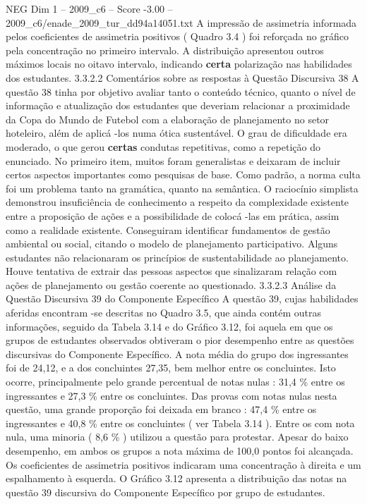 \begin{textsample}{NEG Dim 1 – 2009\_c6 – Score -3.00 – 2009\_c6/enade\_2009\_tur\_dd94a14051.txt}
A impressão de assimetria informada pelos coeficientes de assimetria positivos ( Quadro 3.4 ) foi reforçada no gráfico pela concentração no primeiro intervalo.
A distribuição apresentou outros máximos locais no oitavo intervalo, indicando \textbf{certa} polarização nas habilidades dos estudantes. 3.3.2.2 Comentários sobre as respostas à Questão Discursiva 38 A questão 38 tinha por objetivo avaliar tanto o conteúdo técnico, quanto o nível de informação e atualização dos estudantes que deveriam relacionar a proximidade da Copa do Mundo de Futebol com a elaboração de planejamento no setor hoteleiro, além de aplicá -los numa ótica sustentável.
O grau de dificuldade era moderado, o que gerou \textbf{certas} condutas repetitivas, como a repetição do enunciado.
No primeiro item, muitos foram generalistas e deixaram de incluir certos aspectos importantes como pesquisas de base.
Como padrão, a norma culta foi um problema tanto na gramática, quanto na semântica.
O raciocínio simplista demonstrou insuficiência de conhecimento a respeito da complexidade existente entre a proposição de ações e a possibilidade de colocá -las em prática, assim como a realidade existente.
Conseguiram identificar fundamentos de gestão ambiental ou social, citando o modelo de planejamento participativo.
Alguns estudantes não relacionaram os princípios de sustentabilidade ao planejamento.
Houve tentativa de extrair das pessoas aspectos que sinalizaram relação com ações de planejamento ou gestão coerente ao questionado. 3.3.2.3 Análise da Questão Discursiva 39 do Componente Específico A questão 39, cujas habilidades aferidas encontram -se descritas no Quadro 3.5, que ainda contém outras informações, seguido da Tabela 3.14 e do Gráfico 3.12, foi aquela em que os grupos de estudantes observados obtiveram o pior desempenho entre as questões discursivas do Componente Específico.
A nota média do grupo dos ingressantes foi de 24,12, e a dos concluintes 27,35, bem melhor entre os concluintes.
Isto ocorre, principalmente pelo grande percentual de notas nulas : 31,4 \% entre os ingressantes e 27,3 \% entre os concluintes.
Das provas com notas nulas nesta questão, uma grande proporção foi deixada em branco : 47,4 \% entre os ingressantes e 40,8 \% entre os concluintes ( ver Tabela 3.14 ).
Entre os com nota nula, uma minoria ( 8,6 \% ) utilizou a questão para protestar.
Apesar do baixo desempenho, em ambos os grupos a nota máxima de 100,0 pontos foi alcançada.
Os coeficientes de assimetria positivos indicaram uma concentração à direita e um espalhamento à esquerda.
O Gráfico 3.12 apresenta a distribuição das notas na questão 39 discursiva do Componente Específico por grupo de estudantes.

\end{textsample}
